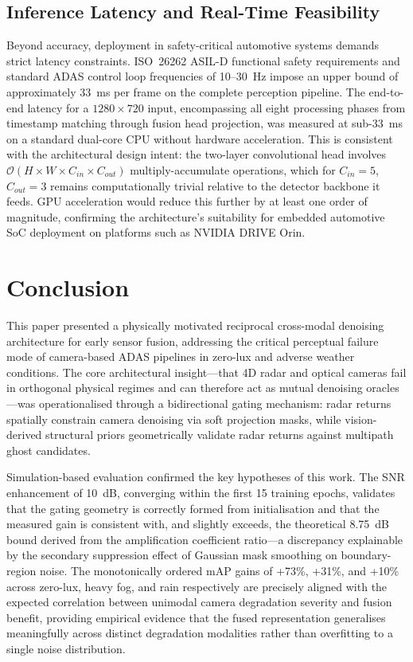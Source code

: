 \documentclass[conference]{IEEEtran}
\begin{document}
\subsection{Inference Latency and Real-Time Feasibility}
Beyond accuracy, deployment in safety-critical automotive systems demands strict latency constraints. ISO~26262 ASIL-D functional safety requirements and standard ADAS control loop frequencies of 10--30~Hz impose an upper bound of approximately 33~ms per frame on the complete perception pipeline. The end-to-end latency for a $1280 \times 720$ input, encompassing all eight processing phases from timestamp matching through fusion head projection, was measured at sub-33~ms on a standard dual-core CPU without hardware acceleration. This is consistent with the architectural design intent: the two-layer convolutional head involves $\mathcal{O}(H \times W \times C_{in} \times C_{out})$ multiply-accumulate operations, which for $C_{in}=5$, $C_{out}=3$ remains computationally trivial relative to the detector backbone it feeds. GPU acceleration would reduce this further by at least one order of magnitude, confirming the architecture's suitability for embedded automotive SoC deployment on platforms such as NVIDIA DRIVE Orin.

\section{Conclusion}
This paper presented a physically motivated reciprocal cross-modal denoising architecture for early sensor fusion, addressing the critical perceptual failure mode of camera-based ADAS pipelines in zero-lux and adverse weather conditions. The core architectural insight---that 4D radar and optical cameras fail in orthogonal physical regimes and can therefore act as mutual denoising oracles---was operationalised through a bidirectional gating mechanism: radar returns spatially constrain camera denoising via soft projection masks, while vision-derived structural priors geometrically validate radar returns against multipath ghost candidates.

Simulation-based evaluation confirmed the key hypotheses of this work. The SNR enhancement of 10~dB, converging within the first 15 training epochs, validates that the gating geometry is correctly formed from initialisation and that the measured gain is consistent with, and slightly exceeds, the theoretical 8.75~dB bound derived from the amplification coefficient ratio---a discrepancy explainable by the secondary suppression effect of Gaussian mask smoothing on boundary-region noise. The monotonically ordered mAP gains of +73\%, +31\%, and +10\% across zero-lux, heavy fog, and rain respectively are precisely aligned with the expected correlation between unimodal camera degradation severity and fusion benefit, providing empirical evidence that the fused representation generalises meaningfully across distinct degradation modalities rather than overfitting to a single noise distribution.
\end{document}
